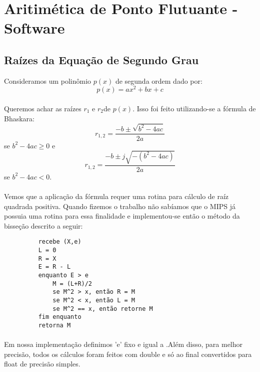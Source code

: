 \section{Aritimética de Ponto Flutuante - Software}

\subsection{Raízes da Equação de Segundo Grau}
Consideramos um polinômio $p(x)$ de segunda ordem dado por:
\begin{equation}
	p(x) = ax^2 + bx + c
\end{equation}

\paragraph{} Queremos achar as raízes $r_1$ e $r_2$de $p(x)$. Isso foi feito
utilizando-se a fórmula de Bhaskara:
\begin{equation}
	r_{1,2} = \frac{-b \pm \sqrt{b^2 -4ac}}{2a}
\end{equation}
se $b^2 -4ac \geq 0$ e 
\begin{equation}
    r_{1,2} = \frac{-b \pm j\sqrt{-(b^2 -4ac)}}{2a}
\end{equation}
se $b^2 -4ac < 0$. 
\paragraph{} Vemos que a aplicação da fórmula requer uma rotina para cálculo de
raíz quadrada positiva. Quando fizemos o trabalho não sabíamos que o MIPS já
possuia uma rotina para essa finalidade e implementou-se então o método da
bisseção descrito a seguir:

\begin{figure}[H]
\centering
\begin{BVerbatim}
    recebe (X,e)
    L = 0
    R = X
    E = R - L
    enquanto E > e
        M = (L+R)/2
        se M^2 > x, então R = M
        se M^2 < x, então L = M
        se M^2 == x, então retorne M
    fim enquanto
    retorna M	
\end{BVerbatim} 
\end{figure}

\paragraph{}Em nossa implementação definimos 'e' fixo e igual a .Além disso,
para melhor precisão, todos os cálculos foram feitos com double e só ao final convertidos para float de
precisão simples.

